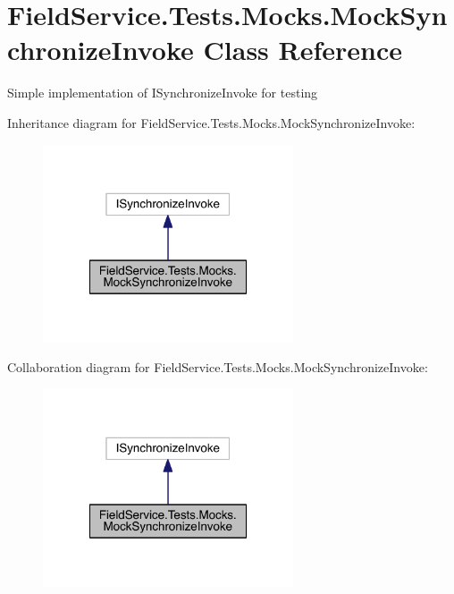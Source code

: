 \hypertarget{class_field_service_1_1_tests_1_1_mocks_1_1_mock_synchronize_invoke}{\section{Field\+Service.\+Tests.\+Mocks.\+Mock\+Synchronize\+Invoke Class Reference}
\label{class_field_service_1_1_tests_1_1_mocks_1_1_mock_synchronize_invoke}
}


Simple implementation of I\+Synchronize\+Invoke for testing  




Inheritance diagram for Field\+Service.\+Tests.\+Mocks.\+Mock\+Synchronize\+Invoke\+:
\nopagebreak
\begin{figure}[H]
\begin{center}
\leavevmode
\includegraphics[width=210pt]{class_field_service_1_1_tests_1_1_mocks_1_1_mock_synchronize_invoke__inherit__graph}
\end{center}
\end{figure}


Collaboration diagram for Field\+Service.\+Tests.\+Mocks.\+Mock\+Synchronize\+Invoke\+:
\nopagebreak
\begin{figure}[H]
\begin{center}
\leavevmode
\includegraphics[width=210pt]{class_field_service_1_1_tests_1_1_mocks_1_1_mock_synchronize_invoke__coll__graph}
\end{center}
\end{figure}
